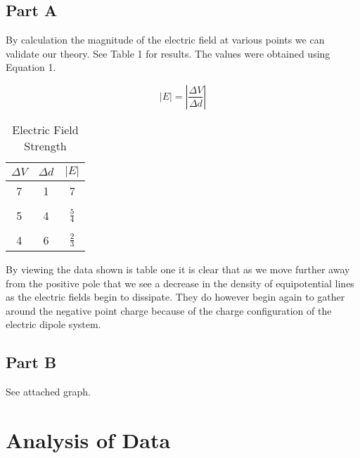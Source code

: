 \documentclass[twocolumn]{article}
\begin{document}
\subsection{Part A} %
\label{sub:part_a}
	
	By calculation the magnitude of the electric field at various points we can validate our theory.  See Table 1 for results.  The values were obtained using Equation 1.

	\begin{equation}
		|E| = |\frac{\Delta V}{\Delta d}|
	\end{equation}

	\begin{table}[b]
		\begin{center}

		\begin{tabular}{ccc}
		\textbf{$\Delta V$} & \textbf{$\Delta d$} & \textbf{$|E|$}\\
		\hline
		7 & 1 & 7\\\\
		5 & 4 & $\frac{5}{4}$\\\\
		4 & 6 & $\frac{2}{3}$
		\end{tabular}
		\label{tab:part_1_mag}
		\caption{Electric Field Strength}

		\end{center}
	\end{table}

	By viewing the data shown is table one it is clear that as we move further away from the positive pole that we see a decrease in the density of equipotential lines as the electric fields begin to dissipate.  They do however begin again to gather around the negative point charge because of the charge configuration of the electric dipole system.

	
	\subsection{Part B} %
	\label{sub:part_b}
	
	See attached graph.
	



\section{Analysis of Data}\label{sec:analysis_of_data}
\end{document}
